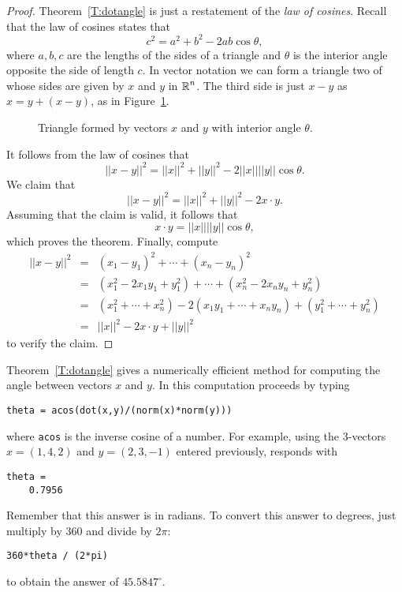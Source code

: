 \documentclass{ximera}
\begin{document}
\begin{proof}  Theorem~\ref{T:dotangle} is just a restatement of the
{\em law of cosines\/}.  Recall that the
law of cosines states that
\[
c^2 = a^2 + b^2 -2ab\cos\theta,
\]
where $a,b,c$ are the lengths of the sides of a triangle and $\theta$
is the interior angle opposite the side of length $c$.
In vector notation we can form a triangle two of whose sides are
given by $x$ and $y$ in $\mbox{$\Bbb{R}$}^n$.  The third side is just $x-y$ as
$x=y+(x-y)$, as in Figure~\ref{F:costri}.

\begin{figure}[htb]
     \centerline{%
     }
     \caption{Triangle formed by vectors $x$ and $y$ with interior
	angle $\theta$.}
     \label{F:costri}
\end{figure}

It follows from the law of cosines that
\[
||x-y||^2 = ||x||^2 + ||y||^2 - 2||x|| ||y||  \cos\theta.
\]
We claim that
\[
||x-y||^2 = ||x||^2 + ||y||^2 -2x\cdot y.
\]
Assuming that the claim is valid, it follows that
\[
x\cdot y = ||x|| ||y||  \cos\theta,
\]
which proves the theorem.  Finally, compute
\begin{eqnarray*}
||x-y||^2 & = &(x_1-y_1)^2 + \cdots + (x_n-y_n)^2 \\
& = & (x_1^2-2x_1y_1+y_1^2) + \cdots + (x_n^2-2x_ny_n+y_n^2)\\
& = & (x_1^2+\cdots+x_n^2)-2(x_1y_1+\cdots+x_ny_n)+(y_1^2+\cdots+y_n^2)\\
& = & ||x||^2 -2x\cdot y + ||y||^2
\end{eqnarray*}
to verify the claim.   \end{proof}

Theorem~\ref{T:dotangle} gives a numerically efficient method
for computing the angle between
vectors $x$ and $y$.  In \Matlab
this computation proceeds by typing
\begin{verbatim}
theta = acos(dot(x,y)/(norm(x)*norm(y)))
\end{verbatim} 
where {\tt acos} is the inverse cosine of a number.
For example, using the $3$-vectors $x = (1,4,2)$ and $y =
(2,3,-1)$ entered previously, \Matlab responds with
\begin{verbatim}
theta =
    0.7956
\end{verbatim}
Remember that this answer is in radians.  To convert
this answer to degrees, just multiply by $360$ and
divide by $2\pi$:
\begin{verbatim}
360*theta / (2*pi)
\end{verbatim}
to obtain the answer of $45.5847^\circ$.
\end{document}
